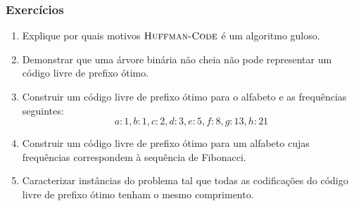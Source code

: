 \documentclass{beamer}
\begin{document}

\begin{frame}
\frametitle{Exercícios}

\begin{enumerate}
\item Explique por quais motivos $\textnormal{\scshape Huffman-Code}$ é um algoritmo guloso.
\item Demonstrar que uma árvore binária não cheia não pode representar um código livre de prefixo ótimo.
\item Construir um código livre de prefixo ótimo para o alfabeto e as frequências seguintes:
$$
a: 1, b: 1, c: 2, d: 3, e: 5, f: 8, g: 13, h: 21
$$
\item Construir um código livre de prefixo ótimo para um alfabeto cujas
  frequências correspondem à sequência de Fibonacci.
\item Caracterizar instâncias do problema tal que todas as codificações do
  código livre de prefixo ótimo tenham o mesmo comprimento.
\end{enumerate}

\end{frame}
\end{document}
